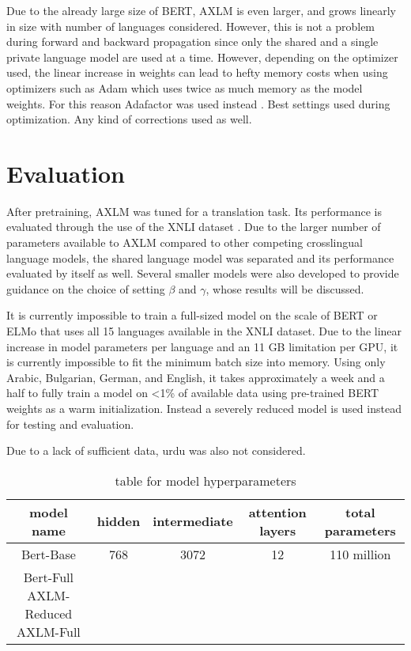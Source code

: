 \documentclass[10pt,letterpaper,twocolumn]{article}
\begin{document}
Due to the already large size of BERT, AXLM is even larger, and grows linearly in size with number of languages considered.  However, this is not a problem during forward and backward propagation since only the shared and a single private language model are used at a time.  However, depending on the optimizer used, the linear increase in weights can lead to hefty memory costs when using optimizers such as Adam which uses twice as much memory as the model weights.  For this reason Adafactor was used instead \cite{}.  Best settings used during optimization.  Any kind of corrections used as well.

\section{Evaluation}
After pretraining, AXLM was tuned for a translation task.  Its performance is evaluated through the use of the XNLI dataset \cite{}.  Due to the larger number of parameters available to AXLM compared to other competing crosslingual language models, the shared language model was separated and its performance evaluated by itself as well.  Several smaller models were also developed to provide guidance on the choice of setting $\beta$ and $\gamma$, whose results will be discussed.

It is currently impossible to train a full-sized model on the scale of BERT or ELMo that uses all 15 languages available in the XNLI dataset.  Due to the linear increase in model parameters per language and an 11 GB limitation per GPU, it is currently impossible to fit the minimum batch size into memory.  Using only Arabic, Bulgarian, German, and English, it takes approximately a week and a half to fully train a model on <1\% of available data using pre-trained BERT weights as a warm initialization.  Instead a severely reduced model is used instead for testing and evaluation.

Due to a lack of sufficient data, urdu was also not considered.

\begin{table}[ht!]
	\centering
	\begin{tabular}{c|cccc}
		model name & hidden & intermediate & attention layers & total parameters \\
		\hline
		Bert-Base & 768 & 3072 & 12 & 110 million \\
		Bert-Full
		AXLM-Reduced
		AXLM-Full
	\end{tabular}
	\caption{table for model hyperparameters}
\end{table}
\end{document}
